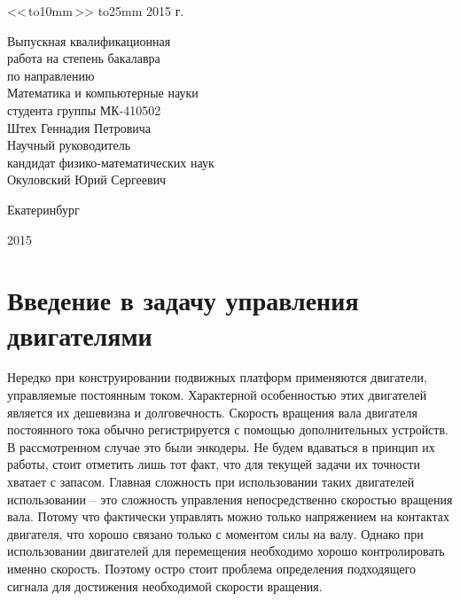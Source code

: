 \documentclass[14pt]{extreport}
\begin{document}
\begin{titlepage}
{\begin{parbox}[t]{9cm}
{                <<\,\hbox to10mm{\hrulefill}\,>>  \hbox to25mm{\hrulefill}  2015 г.
            }
            \end{parbox}
            \begin{parbox}[t]{9cm}{\small  {}
                Выпускная квалификационная \\
                работа на степень бакалавра\\
                 по направлению\\
                Математика и компьютерные науки\\
                студента группы МК-410502 \\
                                \bigskip
                Штех Геннадия Петровича\\
                Научный руководитель\\
                кандидат физико-математических наук \\
                Окуловский Юрий Сергеевич\\
            }
            \end{parbox}
        \vfill
        \centerline{Екатеринбург}
        \centerline{2015}
        }\restoregeometry
    \end{titlepage}
\newpage
    \tableofcontents

\newpage
    \chapter{Введение в задачу управления двигателями}
        Нередко при конструировании подвижных платформ применяются двигатели, управляемые постоянным током. Характерной особенностью этих двигателей является их дешевизна и долговечность. Скорость вращения вала двигателя постоянного тока обычно регистрируется с помощью дополнительных устройств. В рассмотренном случае это были энкодеры. Не будем вдаваться в принцип их работы, стоит отметить лишь тот факт, что для текущей задачи их точности хватает с запасом. Главная сложность при использовании таких двигателей использовании -- это сложность управления непосредственно скоростью вращения вала. Потому что фактически управлять можно только напряжением на контактах двигателя, что хорошо связано только с моментом силы на валу. Однако при использовании двигателей для перемещения необходимо хорошо контролировать именно скорость. Поэтому остро стоит проблема определения подходящего сигнала для достижения необходимой скорости вращения.
\end{document}
